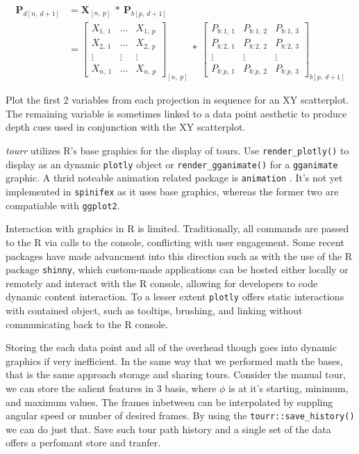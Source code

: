 \documentclass{monashthesis}
\begin{document}
\begin{align}
  \textbf{P}_{d[n,~d+1]}
    &= \textbf{X}_{[n,~p]} ~*~ \textbf{P}_{b[p,~d+1]} \\
    &= \begin{bmatrix}
      X_{1,~1} & \dots & X_{1,~p} \\
      X_{2,~1} & \dots & X_{2,~p} \\
      \vdots   & \vdots & \vdots  \\
      X_{n,~1} & \dots & X_{n,~p}
    \end{bmatrix}_{[n,~p]}
      ~*~
    \begin{bmatrix}
      P_{b:1,~1} & P_{b:1,~2} & P_{b:1,~3} \\
      P_{b:2,~1} & P_{b:2,~2} & P_{b:2,~3} \\
      \vdots     & \vdots     & \vdots     \\
      P_{b:p,~1} & P_{b:p,~2} & P_{b:p,~3}
    \end{bmatrix}_{b[p,~d+1]}
\end{align}

Plot the first 2 variables from each projection in sequence for an XY
scatterplot. The remaining variable is sometimes linked to a data point
aesthetic to produce depth cues used in conjunction with the XY
scatterplot.

\emph{tourr} utilizes R's base graphics for the display of tours. Use
\texttt{render\_plotly()} to display as an dynamic \texttt{plotly}
\textcite{sievert_plotly_2018} object or \texttt{render\_gganimate()}
for a \texttt{gganimate} \textcite{pedersen_gganimate:_2019} graphic. A
thrid noteable animation related package is \texttt{animation}
\textcite{xie_animation:_2018}. It's not yet implemented in
\texttt{spinifex} as it uses base graphics, whereas the former two are
compatiable with \texttt{ggplot2}.

Interaction with graphics in R is limited. Traditionally, all commands
are passed to the R via calls to the console, conflicting with user
engagement. Some recent packages have made advancment into this
direction such as with the use of the R package \texttt{shinny}, which
custom-made applications can be hosted either locally or remotely and
interact with the R console, allowing for developers to code dynamic
content interaction. To a lesser extent \texttt{plotly} offers static
interactions with contained object, such as tooltips, brushing, and
linking without communicating back to the R console.

Storing the each data point and all of the overhead though goes into
dynamic graphics if very inefficient. In the same way that we performed
math the bases, that is the same approach storage and sharing tours.
Consider the manual tour, we can store the salient features in 3 basis,
where \(\phi\) is at it's starting, minimum, and maximum values. The
frames inbetween can be interpolated by suppling angular speed or number
of desired frames. By using the \texttt{tourr::save\_history()} we can
do just that. Save such tour path history and a single set of the data
offers a perfomant store and tranfer.
\end{document}
